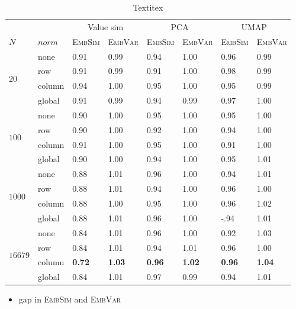 \documentclass[]{article}
\begin{document}
\begin{table}
	\centering
	\renewcommand{\arraystretch}{1.5}
	
	\begin{tabular}{ll|ll|ll|ll|}
		
		&&\multicolumn{2}{c|}{Value sim}&\multicolumn{2}{c|}{PCA}&\multicolumn{2}{c|}{UMAP}\\
		$N$&$norm$&\textsc{EmbSim}&\textsc{EmbVar}&\textsc{EmbSim}&\textsc{EmbVar}&\textsc{EmbSim}&\textsc{EmbVar}\\
		\hline
		\multirow{4}{*}{$20$}&none&0.91&0.99&0.94&1.00&0.96&0.99\\
		&row&0.91&0.99&0.91&1.00&0.98&0.99\\
		&column&0.94&1.00&0.95&1.00&0.95&0.99\\
		&global&0.91&0.99&0.94&0.99&0.97&1.00\\
		\hline
		\multirow{4}{*}{$100$}&none&0.90&1.00&0.95&1.00&0.95&1.00\\
		&row&0.90&1.00&0.92&1.00&0.94&1.00\\
		&column&0.91&1.00&0.95&1.00&0.91&1.00\\
		&global&0.90&1.00&0.94&1.00&0.95&1.01\\
		\hline
		\multirow{4}{*}{$1000$}&none&0.88&1.01&0.96&1.00&0.94&1.01\\
		&row&0.88&1.01&0.94&1.00&0.96&1.00\\
		&column&0.88&1.00&0.95&1.00&0.96&1.02\\
		&global&0.88&1.01&0.96&1.00&-.94&1.01\\
		\hline
		\multirow{4}{*}{$16679$}&none&0.84&1.01&0.96&1.00&0.92&1.03\\
		&row&0.84&1.01&0.94&1.01&0.96&1.00\\
		&column&\textbf{0.72}&\textbf{1.03}&\textbf{0.96}&\textbf{1.02}&\textbf{0.96}&\textbf{1.04}\\
		&global&0.84&1.01&0.97&0.99&0.94&1.01\\
		
		
	\end{tabular}
	\caption{Textitex}
	\label{tab:gen_red eample}
\end{table}

\begin{itemize}
	\item gap in \textsc{EmbSim} and \textsc{EmbVar}
\end{itemize}
\end{document}

